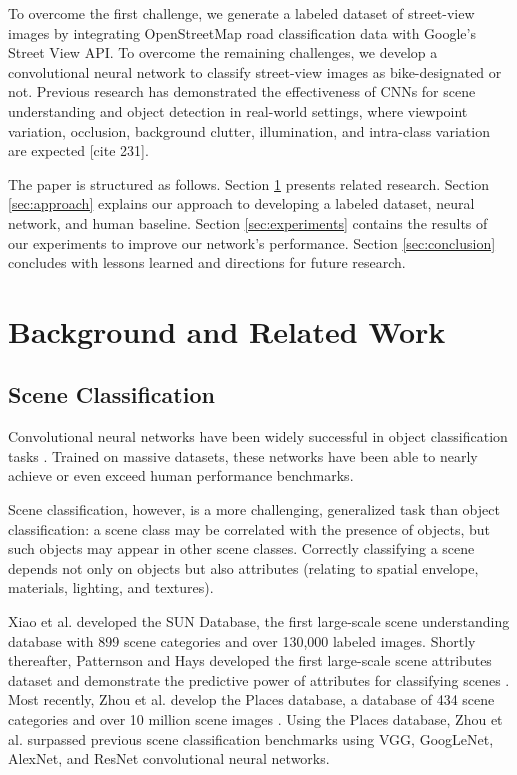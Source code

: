 \documentclass[10pt,twocolumn,letterpaper]{article}
\begin{document}
To overcome the first challenge, we generate a labeled dataset of street-view images by integrating OpenStreetMap road classification data with Google's Street View API. To overcome the remaining challenges, we develop a convolutional neural network to classify street-view images as bike-designated or not. Previous research has demonstrated the effectiveness of CNNs for scene understanding and object detection in real-world settings, where viewpoint variation, occlusion, background clutter, illumination, and intra-class variation are expected [cite 231]. 

The paper is structured as follows. Section \ref{sec:background} presents related research. Section \ref{sec:approach} explains our approach to developing a labeled dataset, neural network, and human baseline. Section \ref{sec:experiments} contains the results of our experiments to improve our network's performance. Section \ref{sec:conclusion} concludes with lessons learned and directions for future research.

\section{Background and Related Work}
\label{sec:background}

\subsection{Scene Classification}
Convolutional neural networks have been widely successful in object classification tasks \cite{krizhevsky2012imagenet}. Trained on massive datasets, these networks have been able to nearly achieve or even exceed human performance benchmarks.

Scene classification, however, is a more challenging, generalized task than object classification: a scene class may be correlated with the presence of objects, but such objects may appear in other scene classes. Correctly classifying a scene depends not only on objects but also attributes (relating to spatial envelope, materials, lighting, and textures).

Xiao et al. developed the SUN Database, the first large-scale scene understanding database with 899 scene categories and over 130,000 labeled images\cite{xiao2010sun}. Shortly thereafter, Patternson and Hays developed the first large-scale scene attributes dataset and demonstrate the predictive power of attributes for classifying scenes \cite{6247998}. Most recently, Zhou et al. develop the Places database, a database of 434 scene categories and over 10 million scene images \cite{DBLP:journals/corr/ZhouKLTO16}. Using the Places database, Zhou et al. surpassed previous scene classification benchmarks using VGG, GoogLeNet, AlexNet, and ResNet convolutional neural networks. 
\end{document}
